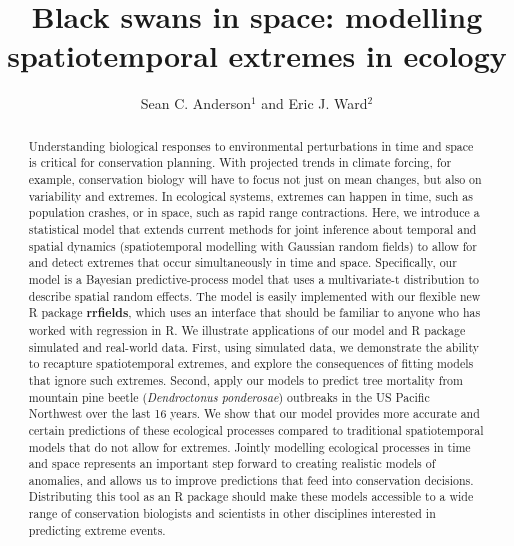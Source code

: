 \documentclass[12pt,english]{article}
\title{Black swans in space: modelling spatiotemporal extremes in ecology}
\author{
Sean C. Anderson$^1$ and
Eric J. Ward$^2$
}
\date{}
\begin{document}
\maketitle
\RaggedRight
{}


\begin{spacing}{1.3}



\begin{abstract}

Understanding biological responses to environmental perturbations in time and
space is critical for conservation planning. With projected trends in climate
forcing, for example, conservation biology will have to focus not just on mean
changes, but also on variability and extremes. In ecological systems, extremes
can happen in time, such as population crashes, or in space, such as rapid
range contractions. Here, we introduce a statistical model that extends current
methods for joint inference about temporal and spatial dynamics (spatiotemporal
modelling with Gaussian random fields) to allow for and detect extremes that
occur simultaneously in time and space. Specifically, our model is a Bayesian
predictive-process model that uses a multivariate-t distribution to describe
spatial random effects. The model is easily implemented with our flexible new R
package \textbf{rrfields}, which uses an interface that should be familiar to
anyone who has worked with regression in R. We illustrate applications of our
model and R package simulated and real-world data. First, using simulated data,
we demonstrate the ability to recapture spatiotemporal extremes, and explore
the consequences of fitting models that ignore such extremes. Second, apply our
models to predict tree mortality from mountain pine beetle (\emph{Dendroctonus
  ponderosae}) outbreaks in the US Pacific Northwest over the last 16 years.
We show that our model provides more accurate and certain
predictions of these ecological processes compared to traditional
spatiotemporal models that do not allow for extremes. Jointly modelling
ecological processes in time and space represents an important step forward to
creating realistic models of anomalies, and allows us to improve predictions
that feed into conservation decisions. Distributing this tool as an R package
should make these models accessible to a wide range of conservation biologists
and scientists in other disciplines interested in predicting extreme events.
\end{abstract}


\end{spacing}
\end{document}

